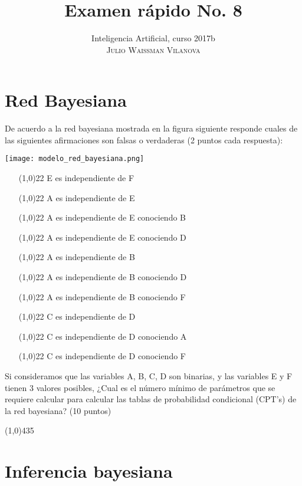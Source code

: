 \documentclass[onecolumn, letter, 11pt]{article}
\title{Examen rápido No. 8}
\author{Inteligencia Artificial, curso 2017b\\ \textsc{Julio Waissman Vilanova}}
\date{}
\begin{document}
\maketitle

\section{Red Bayesiana}

 De acuerdo a la red bayesiana mostrada en la figura siguiente responde cuales de las siguientes afirmaciones son falsas o verdaderas (2 puntos cada
respuesta):

\begin{center}
   \texttt{[image: modelo\_red\_bayesiana.png]}
\end{center}

\begin{enumerate}
\item[\line(1,0){22}] E es independiente de F
\item[\line(1,0){22}] A es independiente de E
\item[\line(1,0){22}] A es independiente de E conociendo B
\item[\line(1,0){22}] A es independiente de E conociendo D
\item[\line(1,0){22}] A es independiente de B
\item[\line(1,0){22}] A es independiente de B conociendo D
\item[\line(1,0){22}] A es independiente de B conociendo F
\item[\line(1,0){22}] C es independiente de D
\item[\line(1,0){22}] C es independiente de D conociendo A
\item[\line(1,0){22}] C es independiente de D conociendo F
\end{enumerate}

Si consideramos que las variables A, B, C, D son binarias, y las variables E y F tienen 3
valores posibles, ¿Cual es el número mínimo de parámetros que se requiere calcular para
calcular las tablas de probabilidad condicional (CPT's) de la red bayesiana? (10 puntos)

\vspace{1cm}

\line(1,0){435}

\section{Inferencia bayesiana}
\end{document}
